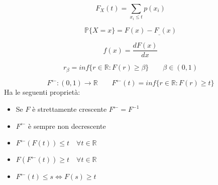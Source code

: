 \begin{definition}[c.d.f. discreta]
	\begin{equation}
		F_X(t) = \sum_{x_i \leq t} p(x_i)
	\end{equation}
\end{definition}

\begin{proposition}
	\begin{equation}
		\mathbb{P}\{X=x\} = F(x) - F_{\_}(x)
	\end{equation}
\end{proposition}

\begin{definition}[c.d.f. continua]
	\begin{equation}
		f(x) = \frac{dF(x)}{dx}
	\end{equation}
\end{definition}

\begin{definition}
	\begin{equation}
		r_\beta = inf\{r \in \mathbb{R} : F(r) \geq \beta\} \quad\quad \beta \in (0,1)
	\end{equation}
\end{definition}

\begin{definition}
	\begin{equation}
		F^{\leftarrow} : (0,1) \to \mathbb{R} \quad\quad F^{\leftarrow}(t)=inf\{r \in \mathbb{R} : F(r) \geq t\}
	\end{equation}
	Ha le seguenti proprietà:
	\begin{itemize}
		\item Se $F$ è strettamente crescente $F^{\leftarrow}=F^{-1}$
		\item $F^{\leftarrow}$ è sempre non decrescente
		\item $F^\leftarrow(F(t)) \leq t \quad \forall t \in \mathbb{R}$
		\item $F(F^\leftarrow(t)) \geq t \quad \forall t \in \mathbb{R}$
		\item $F^\leftarrow(t) \leq s \Leftrightarrow F(s) \geq t$
	\end{itemize}
\end{definition}

